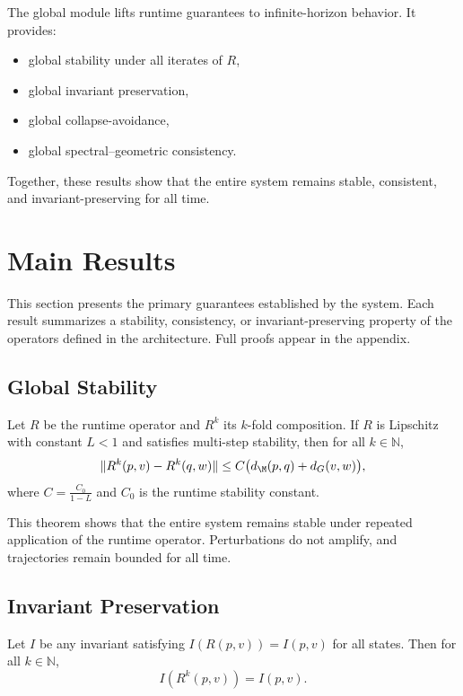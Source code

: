 \documentclass[11pt]{article}
\begin{document}
The global module lifts runtime guarantees to infinite-horizon behavior.
It provides:

\begin{itemize}
    \item global stability under all iterates of $R$,
    \item global invariant preservation,
    \item global collapse-avoidance,
    \item global spectral--geometric consistency.
\end{itemize}

Together, these results show that the entire system remains stable,
consistent, and invariant-preserving for all time.

\section{Main Results}

This section presents the primary guarantees established by the system.
Each result summarizes a stability, consistency, or invariant-preserving
property of the operators defined in the architecture. Full proofs appear
in the appendix.

\subsection{Global Stability}

\begin{theorem}
Let $R$ be the runtime operator and $R^k$ its $k$-fold composition. If $R$
is Lipschitz with constant $L < 1$ and satisfies multi-step stability,
then for all $k \in \mathbb{N}$,
\[
\|R^k(p,v) - R^k(q,w)\|
\le
C\big(d_\M(p,q) + d_G(v,w)\big),
\]
where $C = \frac{C_0}{1-L}$ and $C_0$ is the runtime stability constant.
\end{theorem}

This theorem shows that the entire system remains stable under repeated
application of the runtime operator. Perturbations do not amplify, and
trajectories remain bounded for all time.

\subsection{Invariant Preservation}

\begin{lemma}
Let $I$ be any invariant satisfying $I(R(p,v)) = I(p,v)$ for all states.
Then for all $k \in \mathbb{N}$,
\[
I(R^k(p,v)) = I(p,v).
\]
\end{lemma}
\end{document}
